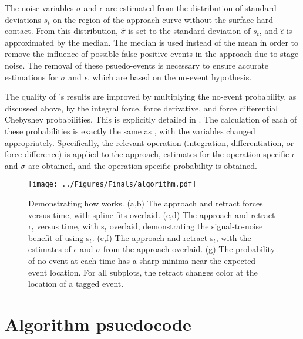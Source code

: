 The noise variables $\sigma$ and $\epsilon$ are estimated from the distribution of standard deviations $s_t$ on the region of the approach curve without the surface hard-contact. From this distribution, $\hat{\sigma}$ is set to the standard deviation of $s_t$, and $\hat{\epsilon}$ is approximated by the median. The median is used instead of the mean in order to remove the influence of possible false-positive events in the approach due to stage noise. The removal of these psuedo-events is necessary to ensure accurate estimations for $\sigma$ and $\epsilon$, which are based on the no-event hypothesis. \pl

The quality of \name{}'s results are improved by multiplying the no-event probability, as discussed above, by the integral force, force derivative, and force differential Chebyshev probabilities. This is explicitly detailed in . The calculation of each of these probabilities is exactly the same as , with the variables changed appropriately. Specifically, the relevant operation (integration, differentiation, or force difference) is applied to the approach, estimates for the operation-specific $\epsilon$ and $\sigma$ are obtained, and the operation-specific probability is obtained.


\begin{figure}[htp]
\caption[\name{} algorithmic pipeline]{\noindent{}\pStartF Demonstrating how \name{} works. (a,b) The approach and retract forces versus time, with spline fits overlaid. (c,d) The approach and retract r$_t$ versus time, with s$_t$ overlaid, demonstrating the signal-to-noise benefit of using s$_t$. (e,f) The approach and retract s$_t$, with the estimates of $\epsilon$ and $\sigma$ from the approach overlaid. (g) The probability of no event at each time has a sharp minima near the expected event location. For all subplots, the retract changes color at the location of a tagged event. \pEndF }
\centering
\texttt{[image: ../Figures/Finals/algorithm.pdf]}%
\end{figure}

\clearpage

\section{Algorithm psuedocode}

